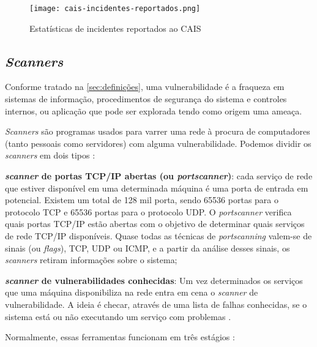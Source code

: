 \begin{figure}[htb]
 \centering
 \caption{Estatísticas de incidentes reportados ao CAIS}
 \texttt{[image: cais-incidentes-reportados.png]}
 \label{fig:cais}
\end{figure}

\subsection{\textit{Scanners}} \label{sec:scanners}

Conforme tratado na \autoref{sec:definições}, uma vulnerabilidade é a fraqueza em sistemas de informação, procedimentos de segurança do sistema e controles internos, ou aplicação que pode ser explorada tendo como origem uma ameaça. 

\textit{Scanners} são programas usados para varrer uma rede à procura de computadores (tanto pessoais como servidores) com alguma vulnerabilidade. Podemos dividir os \textit{scanners} em dois tipos \cite{univhacker}: 

\begin{alineas}
\item \textbf{\textit{scanner} de portas TCP/IP abertas (ou \textit{portscanner})}: cada serviço de rede que estiver disponível em uma determinada máquina é uma porta de entrada em potencial. Existem um total de 128 mil porta, sendo 65536 portas para o protocolo TCP e 65536 portas para o protocolo UDP. O \textit{portscanner} verifica quais portas TCP/IP estão abertas com o objetivo de determinar quais serviços de rede TCP/IP disponíveis. Quase todas as técnicas de \textit{portscanning} valem-se de sinais (ou \textit{flags}), TCP, UDP ou ICMP, e a partir da análise desses sinais, os \textit{scanners} retiram informações sobre o sistema; \cite{univhacker}
\item \textbf{\textit{scanner} de vulnerabilidades conhecidas}: Um vez determinados os serviços que uma máquina disponibiliza na rede entra em cena o \textit{scanner} de vulnerabilidade. A ideia é checar, através de uma lista de falhas conhecidas, se o sistema está ou não executando um serviço com problemas \cite{univhacker}. 
\end{alineas}

Normalmente, essas ferramentas funcionam em três estágios \cite{avaliacao:tania}:

